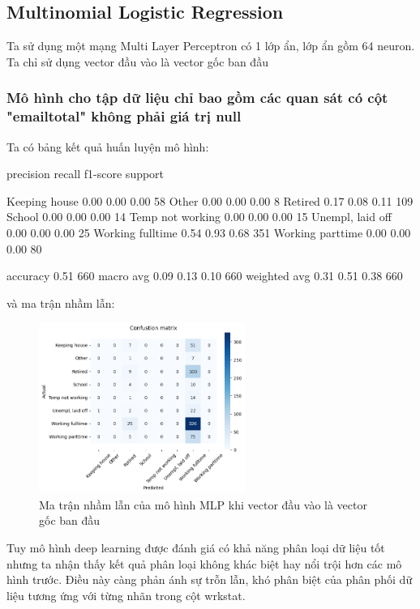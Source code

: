 \subsection{Multinomial Logistic Regression}

Ta sử dụng một mạng Multi Layer Perceptron có 1 lớp ẩn, lớp ẩn gồm 64 neuron.
Ta chỉ sử dụng vector đầu vào là vector gốc ban đầu

\subsubsection{Mô hình cho tập dữ liệu chỉ bao gồm các quan sát có cột "emailtotal" không phải giá trị null}

Ta có bảng kết quả huấn luyện mô hình:

\begin{python}
                    precision    recall  f1-score   support

   Keeping house       0.00      0.00      0.00        58
           Other       0.00      0.00      0.00         8
         Retired       0.17      0.08      0.11       109
          School       0.00      0.00      0.00        14
Temp not working       0.00      0.00      0.00        15
Unempl, laid off       0.00      0.00      0.00        25
Working fulltime       0.54      0.93      0.68       351
Working parttime       0.00      0.00      0.00        80

        accuracy                           0.51       660
       macro avg       0.09      0.13      0.10       660
    weighted avg       0.31      0.51      0.38       660
\end{python}

và ma trận nhầm lẫn:

\begin{figure}[H]
    \centering
    \includegraphics[width=0.6\textwidth]{figures/Thanh/Models/MLP_Deep_Learning/Non_null_models_confusion_matrix_MLP_original_features.png}
    \caption{Ma trận nhầm lẫn của mô hình MLP khi vector đầu vào là vector gốc ban đầu}
    \label{fig:Non_null_models_confusion_matrix_MLP_original_features}
\end{figure}

Tuy mô hình deep learning được đánh giá có khả năng phân loại dữ liệu tốt nhưng ta nhận thấy kết quả phân loại không khác biệt hay nổi trội hơn các mô hình trước.
Điều này càng phản ánh sự trỗn lẫn, khó phân biệt của phân phối dữ liệu tương ứng với từng nhãn trong cột wrkstat.